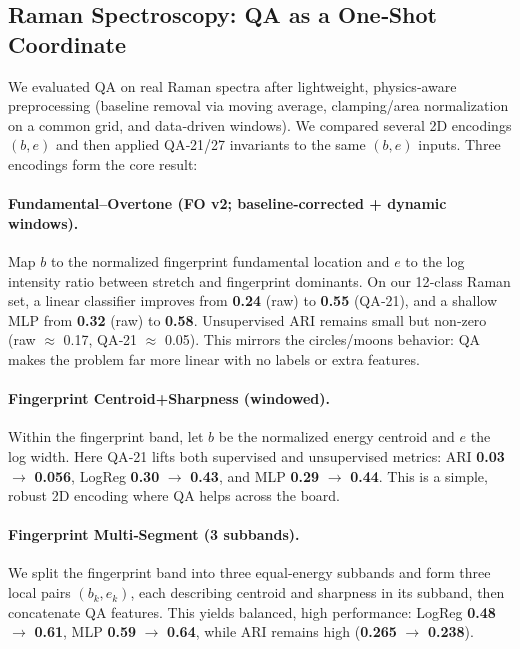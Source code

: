 

\subsection{Raman Spectroscopy: QA as a One‑Shot Coordinate}

We evaluated QA on real Raman spectra after lightweight, physics‑aware preprocessing (baseline removal via moving average, clamping/area normalization on a common grid, and data‑driven windows). We compared several 2D encodings \((b,e)\) and then applied QA‑21/27 invariants to the same \((b,e)\) inputs. Three encodings form the core result:

\paragraph{Fundamental–Overtone (FO v2; baseline‑corrected + dynamic windows).}
Map $b$ to the normalized fingerprint fundamental location and $e$ to the log intensity ratio between stretch and fingerprint dominants. On our 12‑class Raman set, a linear classifier improves from \textbf{0.24} (raw) to \textbf{0.55} (QA‑21), and a shallow MLP from \textbf{0.32} (raw) to \textbf{0.58}. Unsupervised ARI remains small but non‑zero (raw $\approx$ 0.17, QA‑21 $\approx$ 0.05). This mirrors the circles/moons behavior: QA makes the problem far more linear with no labels or extra features.

\paragraph{Fingerprint Centroid+Sharpness (windowed).}
Within the fingerprint band, let $b$ be the normalized energy centroid and $e$ the log width. Here QA‑21 lifts both supervised and unsupervised metrics: ARI \textbf{0.03} $\to$ \textbf{0.056}, LogReg \textbf{0.30} $\to$ \textbf{0.43}, and MLP \textbf{0.29} $\to$ \textbf{0.44}. This is a simple, robust 2D encoding where QA helps across the board.

\paragraph{Fingerprint Multi‑Segment (3 subbands).}
We split the fingerprint band into three equal‑energy subbands and form three local pairs \((b_k,e_k)\), each describing centroid and sharpness in its subband, then concatenate QA features. This yields balanced, high performance: LogReg \textbf{0.48} $\to$ \textbf{0.61}, MLP \textbf{0.59} $\to$ \textbf{0.64}, while ARI remains high (\textbf{0.265} $\to$ \textbf{0.238}).

